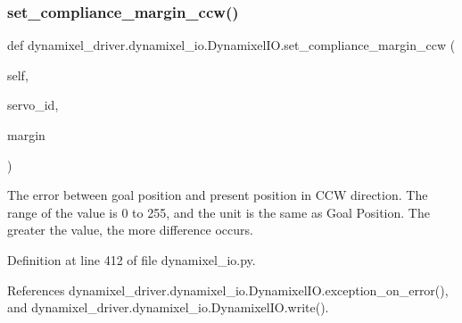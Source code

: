 \subsubsection{\texorpdfstring{set\+\_\+compliance\+\_\+margin\+\_\+ccw()}{set\_compliance\_margin\_ccw()}}
{\footnotesize\ttfamily def dynamixel\+\_\+driver.\+dynamixel\+\_\+io.\+Dynamixel\+I\+O.\+set\+\_\+compliance\+\_\+margin\+\_\+ccw (\begin{DoxyParamCaption}\item[{}]{self,  }\item[{}]{servo\+\_\+id,  }\item[{}]{margin }\end{DoxyParamCaption})}

\begin{DoxyVerb}The error between goal position and present position in CCW direction.
The range of the value is 0 to 255, and the unit is the same as Goal Position.
The greater the value, the more difference occurs.
\end{DoxyVerb}
 

Definition at line 412 of file dynamixel\+\_\+io.\+py.



References dynamixel\+\_\+driver.\+dynamixel\+\_\+io.\+Dynamixel\+I\+O.\+exception\+\_\+on\+\_\+error(), and dynamixel\+\_\+driver.\+dynamixel\+\_\+io.\+Dynamixel\+I\+O.\+write().


